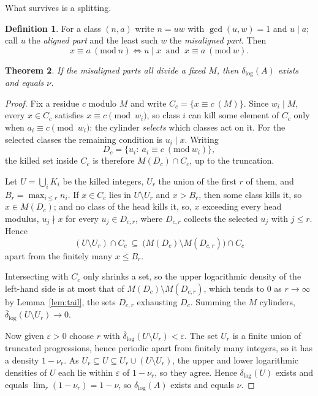 \documentclass[11pt]{article}
\theoremstyle{plain}
\newtheorem{theorem}{Theorem}[section]
\theoremstyle{definition}
\newtheorem{definition}[theorem]{Definition}
\newcommand{\dlog}{\delta_{\log}}
\begin{document}
What survives is a splitting.

\begin{definition}
For a class $(n,a)$ write $n=uw$ with $\gcd(u,w)=1$ and
$u\mid a$; call $u$ the \emph{aligned part} and the least such
$w$ the \emph{misaligned part}.  Then
\[
  x\equiv a\ (\mathrm{mod}\ n)
  \iff u\mid x \ \text{ and }\ x\equiv a\ (\mathrm{mod}\ w).
\]
\end{definition}

\begin{theorem}\label{thm:bounded}
If the misaligned parts all divide a fixed $M$, then $\dlog(A)$
exists and equals $\nu$.
\end{theorem}

\begin{proof}
Fix a residue $c$ modulo $M$ and write $C_c=\{x\equiv c\ (M)\}$.
Since $w_i\mid M$, every $x\in C_c$ satisfies
$x\equiv c\pmod{w_i}$, so class $i$ can kill some element of
$C_c$ only when $a_i\equiv c\pmod{w_i}$: the cylinder
\emph{selects} which classes act on it.  For the selected
classes the remaining condition is $u_i\mid x$.  Writing
\[
  D_c=\{u_i:\ a_i\equiv c\ (\mathrm{mod}\ w_i)\},
\]
the killed set inside $C_c$ is therefore $M(D_c)\cap C_c$, up to
the truncation.

Let $U=\bigcup_i K_i$ be the killed integers, $U_r$ the union
of the first $r$ of them, and
$B_r=\max_{i\le r}n_i$.  If $x\in C_c$ lies in $U\setminus U_r$
and $x>B_r$, then some class kills it, so $x\in M(D_c)$; and no
class of the head kills it, so, $x$ exceeding every head
modulus, $u_j\nmid x$ for every $u_j\in D_{c,r}$, where
$D_{c,r}$ collects the selected $u_j$ with $j\le r$.  Hence
\[
  (U\setminus U_r)\cap C_c\ \subseteq\
  \bigl(M(D_c)\setminus M(D_{c,r})\bigr)\cap C_c
\]
apart from the finitely many $x\le B_r$.

Intersecting with $C_c$ only shrinks a set, so the upper
logarithmic density of the left-hand side is at most that of
$M(D_c)\setminus M(D_{c,r})$, which tends to $0$ as
$r\to\infty$ by Lemma~\ref{lem:tail}, the sets $D_{c,r}$
exhausting $D_c$.  Summing the $M$ cylinders,
$\overline{\delta}_{\log}(U\setminus U_r)\to0$.

Now given $\varepsilon>0$ choose $r$ with
$\overline{\delta}_{\log}(U\setminus U_r)<\varepsilon$.  The set
$U_r$ is a finite union of truncated progressions, hence
periodic apart from finitely many integers, so it has a density
$1-\nu_r$.  As $U_r\subseteq U\subseteq U_r\cup(U\setminus U_r)$,
the upper and lower logarithmic densities of $U$ each lie within
$\varepsilon$ of $1-\nu_r$, so they agree.  Hence $\dlog(U)$
exists and equals $\lim_r(1-\nu_r)=1-\nu$, so $\dlog(A)$ exists
and equals $\nu$.
\end{proof}
\end{document}
